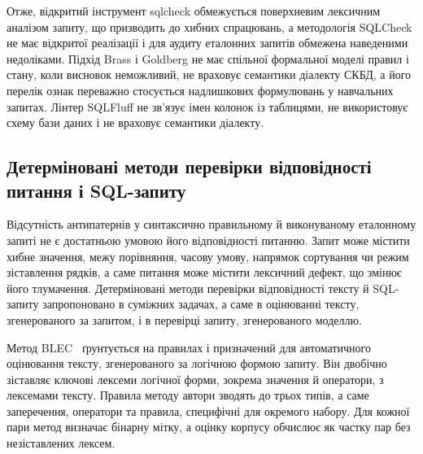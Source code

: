 \documentclass[a4paper,14pt,oneside]{extreport}
\begin{document}
Отже, відкритий інструмент sqlcheck обмежується поверхневим лексичним аналізом запиту, що призводить до хибних спрацювань, а методологія SQLCheck не має відкритої реалізації і для аудиту еталонних запитів обмежена наведеними недоліками. Підхід Brass і Goldberg не має спільної формальної моделі правил і стану, коли висновок неможливий, не враховує семантики діалекту СКБД, а його перелік ознак переважно стосується надлишкових формулювань у навчальних запитах. Лінтер SQLFluff не зв'язує імен колонок із таблицями, не використовує схему бази даних і не враховує семантики діалекту.

\subsection{Детерміновані методи перевірки відповідності питання і SQL-запиту}
\label{subsec:question-sql}

Відсутність антипатернів у синтаксично правильному й виконуваному еталонному запиті не є достатньою умовою його відповідності питанню. Запит може містити хибне значення, межу порівняння, часову умову, напрямок сортування чи режим зіставлення рядків, а саме питання може містити лексичний дефект, що змінює його тлумачення. Детерміновані методи перевірки відповідності тексту й SQL-запиту запропоновано в суміжних задачах, а саме в оцінюванні тексту, згенерованого за запитом, і в перевірці запиту, згенерованого моделлю.

Метод BLEC~\cite{shu2021blec} ґрунтується на правилах і призначений для автоматичного оцінювання тексту, згенерованого за логічною формою запиту. Він двобічно зіставляє ключові лексеми логічної форми, зокрема значення й оператори, з лексемами тексту. Правила методу автори зводять до трьох типів, а саме заперечення, оператори та правила, специфічні для окремого набору. Для кожної пари метод визначає бінарну мітку, а оцінку корпусу обчислює як частку пар без незіставлених лексем.
\end{document}
